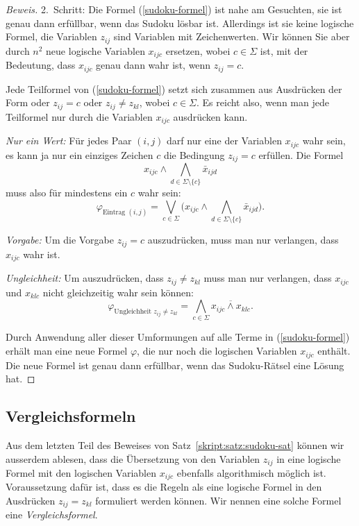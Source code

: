 \begin{proof}[Beweis]
2.~Schritt: Die Formel (\ref{sudoku-formel}) ist nahe am Gesuchten,
sie ist genau dann erfüllbar, wenn das Sudoku lösbar ist.
Allerdings
ist sie keine logische Formel, die Variablen $z_{ij}$ sind Variablen mit
Zeichenwerten.
Wir können Sie aber durch $n^2$ neue logische Variablen
$x_{ijc}$ ersetzen, wobei $c\in \Sigma$ ist, mit der Bedeutung, dass
$x_{ijc}$ genau dann wahr ist, wenn $z_{ij}=c$.

Jede Teilformel von (\ref{sudoku-formel}) setzt sich zusammen
aus Ausdrücken der Form oder $z_{ij}=c$
oder $z_{ij}\ne z_{kl}$, wobei $c\in\Sigma$.
Es reicht also, wenn man jede Teilformel nur durch die Variablen $x_{ijc}$ 
ausdrücken kann.
\begin{compactenum}
\item {\em Nur ein Wert:} Für jedes Paar $(i,j)$ darf nur eine der
Variablen $x_{ijc}$ wahr sein, es kann ja nur ein einziges Zeichen $c$
die Bedingung $z_{ij}=c$ erfüllen.
Die Formel
\[
x_{ijc}\wedge \bigwedge_{d\in\Sigma\setminus\{c\}}\bar x_{ijd}
\]
muss also für mindestens ein $c$ wahr sein:
\[
\varphi_{\text{Eintrag $(i,j)$}}
=
\bigvee_{c\in \Sigma}
\biggl(
x_{ijc}\wedge \bigwedge_{d\in\Sigma\setminus\{c\}}\bar x_{ijd}
\biggr).
\]
\item {\em Vorgabe:} Um die Vorgabe $z_{ij}=c$ auszudrücken, muss man
nur verlangen, dass $x_{ijc}$ wahr ist.
\item {\em Ungleichheit:} Um auszudrücken, dass $z_{ij} \ne z_{kl}$ muss
man nur verlangen, dass $x_{ijc}$ und $x_{klc}$ nicht gleichzeitig wahr
sein können:
\[
\varphi_{\text{Ungleichheit $z_{ij}\ne z_{kl}$}}
=
\bigwedge_{c\in\Sigma}
\overline{x_{ijc}\wedge x_{klc}}.
\]
\end{compactenum}
Durch Anwendung aller dieser Umformungen auf alle Terme in (\ref{sudoku-formel})
erhält man eine neue Formel $\varphi$, die nur noch die logischen
Variablen $x_{ijc}$ enthält.
Die neue Formel ist genau dann erfüllbar,
wenn das Sudoku-Rätsel eine Lösung hat.
\end{proof}

\subsection{Vergleichsformeln}
Aus dem letzten Teil des Beweises von Satz~\ref{skript:satz:sudoku-sat}
können wir ausserdem ablesen, dass die Übersetzung von den Variablen $z_{ij}$
in eine logische Formel mit den logischen Variablen $x_{ijc}$ ebenfalls
algorithmisch möglich ist.
Voraussetzung dafür ist, dass es die Regeln als eine logische Formel
in den Ausdrücken $z_{ij}=z_{kl}$ formuliert werden können.
Wir nennen eine solche Formel eine {\em Vergleichsformel}.

